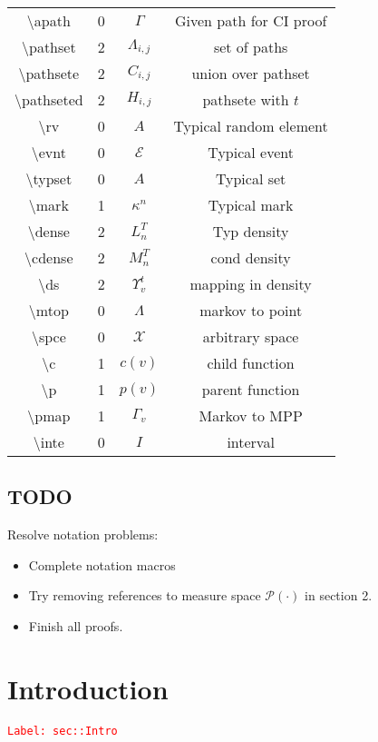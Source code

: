 \documentclass[12pt]{article}
\newcommand{\mc}{\mathcal}
\newcommand{\tr}{\textcolor{red}}
\newcommand{\labe}[1]{\tr{\texttt{Label: #1}}}
\newcommand{\tbs}{\textbackslash}
\newcommand{\pmsr}{\mc{P}}							%
\renewcommand{\v}{v}							%
\newcommand{\T}{T}								%
\renewcommand{\t}{t}							%
\newcommand{\itt}{i}								%
\newcommand{\ittt}{j}								%
\newcommand{\numb}{n}								%
\newcommand{\apath}{\Gamma}						%
\newcommand{\pathset}[2]{\Lambda_{#1,#2}}			%
\newcommand{\pathsete}[2]{C_{#1,#2}}			%
\newcommand{\pathseted}[2]{H_{#1,#2}}			%
\newcommand{\rv}{A}								%
\newcommand{\evnt}{\mc{E}}						%
\newcommand{\typset}{A}							%
\renewcommand{\mark}[1]{\kappa^{#1}}				%
\newcommand{\dense}[2]{L_{#1}^{#2}}				%
\newcommand{\cdense}[2]{M_{#1}^{#2}}			%
\newcommand{\ds}[2]{\Upsilon_{#1}^{#2}}			%
\newcommand{\mtop}{\Lambda}						%
\newcommand{\spce}{\mc{X}}						%
\renewcommand{\c}[1]{c(#1)}						%
\newcommand{\p}[1]{p(#1)}						%
\newcommand{\pmap}[1]{\Gamma_{#1}}				%
\newcommand{\inte}{I}							%
\begin{document}
\begin{longtable}{c|c|c|c}
\tbs apath&0&\(\apath\)						&Given path for CI proof\\
\tbs pathset&2&\(\pathset{\itt}{\ittt}\)	&set of paths\\
\tbs pathsete&2&\(\pathsete{\itt}{\ittt}\)	&union over pathset\\
\tbs pathseted&2&\(\pathseted{\itt}{\ittt}\)&pathsete with \(\t\)\\
\tbs rv&0& \(\rv\)							&Typical random element\\
\tbs evnt&0&\(\evnt\)						&Typical event\\
\tbs typset&0&\(\typset\)					&Typical set\\
\tbs mark&1&\(\mark{\numb}\)				&Typical mark\\
\tbs dense&2& \(\dense{\numb}{\T}\)			&Typ density\\
\tbs cdense&2&\(\cdense{\numb}{\T}\)		&cond density\\
\tbs ds&2& \(\ds{\v}{\t}\)					&mapping in density\\
\tbs mtop &0& \(\mtop\)						&markov to point\\
\tbs spce &0&\(\spce\)						&arbitrary space\\
\tbs c &1& \(\c{\v}\)						&child function\\
\tbs p &1& \(\p{\v}\)						&parent function \\
\tbs pmap &1& \(\pmap{\v}\)					&Markov to MPP\\
\tbs inte &0& \(\inte\)						&interval
\end{longtable}

\subsection*{TODO}

Resolve notation problems:

\begin{itemize}
\item Complete notation macros

\item Try removing references to measure space \(\pmsr(\cdot)\) in section 2.

\item Finish all proofs.
\end{itemize}

\section{Introduction}
\label{sec::Intro}\labe{sec::Intro}
\end{document}
